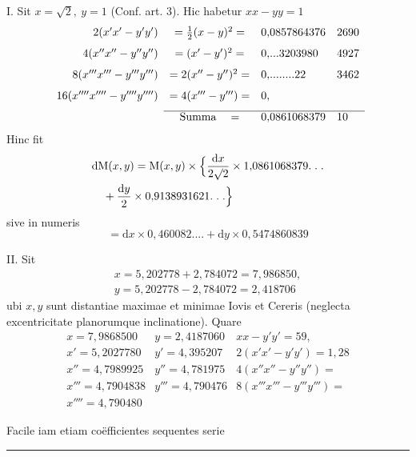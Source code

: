 \par I. Sit \(x=\surd 2,\ y=1\) (Conf. art. 3). Hic habetur \(xx-yy=1\)
\begingroup\small\setlength{\arraycolsep}{3pt}
\[
\begin{array}{rcll}
2(x'x'-y'y')&=\tfrac12(x-y)^2=&0{,}0857864376&2690\\[7pt]
4(x''x''-y''y'')&=(x'-y')^2=&0{,}\mathord{.}\mathord{.}\mathord{.}3203980&4927\\[7pt]
8(x'''x'''-y'''y''')&=2(x''-y'')^2=&0{,}\mathord{.}\mathord{.}\mathord{.}\mathord{.}\mathord{.}\mathord{.}\mathord{.}\mathord{.}22&3462\\[7pt]
16(x''''x''''-y''''y'''')&=4(x'''-y''')=&0{,}&\\[7pt]
\cline{2-4}
&\mathrm{Summa}\quad=&0{,}0861068379&10
\end{array}
\]
\endgroup
Hinc fit
\[
\begin{aligned}&\mathrm{d}\mathrm{M}(x,y)=\mathrm{M}(x,y)\times
\Bigl\{\frac{\mathrm{d}x}{2\surd 2}\times1{,}0861068379.\;.\;.\\&\quad+\frac{\mathrm{d}y}{2}\times0{,}9138931621.\;.\;.\Bigr\}\end{aligned}
\]
sive in numeris
\[
=\mathrm{d}x\times0{,}460082\mathord{.}\mathord{.}\mathord{.}\mathord{.}
+\mathrm{d}y\times0{,}5474860839
\]
\par II. Sit
\[
\begin{gathered}x=5{,}202778+2{,}784072=7{,}986850,\\[7pt]
y=5{,}202778-2{,}784072=2{,}418706\end{gathered}
\]
ubi \(x,y\) sunt distantiae maximae et minimae Iovis et Cereris (neglecta excentricitate planorumque inclinatione). Quare
\begingroup\small\setlength{\arraycolsep}{3pt}
\[
\begin{array}{lll}
x=7{,}9868500&y=2{,}4187060&xx-y'y'=59{,}\\[7pt]
x'=5{,}2027780&y'=4{,}395207&2(x'x'-y'y')=1{,}28\\[7pt]
x''=4{,}7989925&y''=4{,}781975&4(x''x''-y''y'')=\\[7pt]
x'''=4{,}7904838&y'''=4{,}790476&8(x'''x'''-y'''y''')=\\[7pt]
x''''=4{,}790480&&
\end{array}
\]
\endgroup

Facile iam etiam coëfficientes sequentes serie

\par\noindent\hfill\rule{0.25\linewidth}{0.4pt}\hfill\mbox{}\par
